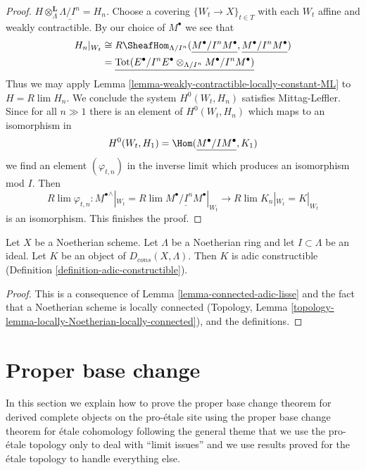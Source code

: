 \begin{proof}
$H \otimes_\Lambda^\mathbf{L} \underline{\Lambda/I^n} = H_n$.
Choose a covering $\{W_t \to X\}_{t \in T}$ with each $W_t$
affine and weakly contractible. By our choice of $M^\bullet$
we see that
\begin{align*}
H_n|_{W_t} & \cong 
R\SheafHom_{\Lambda/I^n}(\underline{M^\bullet/I^nM^\bullet},
\underline{M^\bullet/I^nM^\bullet}) \\
& =
\underline{
\text{Tot}(E^\bullet/I^nE^\bullet \otimes_{\Lambda/I^n} M^\bullet/I^nM^\bullet)
}
\end{align*}
Thus we may apply Lemma \ref{lemma-weakly-contractible-locally-constant-ML}
to $H = R\lim H_n$. We conclude the system $H^0(W_t, H_n)$ satisfies
Mittag-Leffler. Since for all $n \gg 1$ there is an element of $H^0(W_t, H_n)$
which maps to an isomorphism in
$$
H^0(W_t, H_1) = \Hom(\underline{M^\bullet/IM^\bullet}, K_1)
$$
we find an element $(\varphi_{t, n})$
in the inverse limit which produces an isomorphism mod $I$. Then
$$
R\lim \varphi_{t, n} :
\underline{M^\bullet}^\wedge|_{W_t} =
R\lim \underline{M^\bullet/I^nM^\bullet}|_{W_t}
\longrightarrow
R\lim K_n|_{W_t} = K|_{W_t}
$$
is an isomorphism. This finishes the proof.
\end{proof}

\begin{proposition}
\label{proposition-Noetherian-adic-constructible}
Let $X$ be a Noetherian scheme. Let $\Lambda$ be a Noetherian ring and
let $I \subset \Lambda$ be an ideal. Let $K$ be an object of
$D_{cons}(X, \Lambda)$. Then $K$ is adic constructible
(Definition \ref{definition-adic-constructible}).
\end{proposition}

\begin{proof}
This is a consequence of Lemma \ref{lemma-connected-adic-lisse}
and the fact that a Noetherian scheme is locally connected
(Topology, Lemma \ref{topology-lemma-locally-Noetherian-locally-connected}),
and the definitions.
\end{proof}







\section{Proper base change}
\label{section-proper-base-change}

\noindent
In this section we explain how to prove the proper base change theorem
for derived complete objects on the pro-\'etale site using the proper
base change theorem for \'etale cohomology following the general theme
that we use the pro-\'etale topology only to deal with ``limit issues''
and we use results proved for the \'etale topology to handle everything
else.

